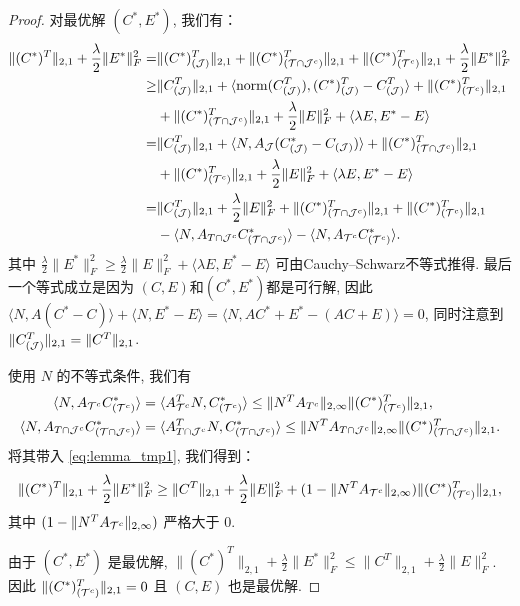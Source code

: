 \begin{proof}
  对最优解 \((C^{*},E^{*})\), 我们有：
  \begin{align}
    \|(C^*)^T\|_{2,1}+\frac{\lambda}{2}\|E^*\|_F^2 =& \|(C^*)^T_{(\mathcal{J})}\|_{2,1}+\|(C^*)^T_{(\mathcal{T}\cap \mathcal{J}^c)}\|_{2,1}+
    \|(C^*)^T_{(\mathcal{T}^c)}\|_{2,1} + \frac{\lambda}{2} \|E^*\|^2_F\nonumber\\
    \geq&\|C^T_{(\mathcal{J})}\|_{2,1}+\langle \operatorname{norm}(C^T_{(\mathcal{J})}),(C^*)^T_{(\mathcal{J})}-C^T_{(\mathcal{J})}
    \rangle+\|(C^*)^T_{(\mathcal{T}^c)}\|_{2,1}\nonumber \\
    &+\|(C^*)^T_{(\mathcal{T}\cap \mathcal{J}^c)}\|_{2,1}+\frac{\lambda}{2} \|E\|^2_F +\langle
    \lambda E,E^*-E\rangle\nonumber\\
    =&\|C^T_{(\mathcal{J})}\|_{2,1}+\langle N,A_{\mathcal{J}}(C^*_{(\mathcal{J})}-C_{(\mathcal{J})})\rangle
     +\|(C^*)^T_{(\mathcal{T}\cap\mathcal{J}^c)}\|_{2,1}\nonumber\\
     &+\|(C^*)^T_{(\mathcal{T}^c)}\|_{2,1} + \frac{\lambda}{2} \|E\|^2_F +\langle
    \lambda E,E^*-E\rangle\nonumber\\
    =&\|C^T_{(\mathcal{J})}\|_{2,1}+\frac{\lambda}{2} \|E\|_F^2+ \|(C^*)^T_{(\mathcal{T}\cap
    \mathcal{J}^c)}\|_{2,1}+\|(C^*)^T_{(\mathcal{T}^c)}\|_{2,1}\nonumber\\
    &-\langle N,A_{T\cap \mathcal{J}^c}C^*_{(\mathcal{T}\cap \mathcal{J}^c)}\rangle
    -\langle N,A_{\mathcal{T}^c}C^*_{(\mathcal{T}^c)}\rangle.
    \label{eq:lemma_tmp1}
  \end{align}
  其中 \(\frac{\lambda}{2} \|E^*\|_F^2 \geq \frac{\lambda}{2} \|E\|_F^2 +\langle
  \lambda E,E^*-E\rangle\) 可由Cauchy–Schwarz不等式推得.
  最后一个等式成立是因为 \((C,E)\)和\((C^*,E^*)\)都是可行解, 因此\(\langle
  N,A(C^*-C)\rangle+\langle N,E^*-E\rangle = \langle
  N,AC^*+E^*-(AC+E)\rangle=0\), 同时注意到 \(\| C^T_{(\mathcal{J})}\|_{2, 1} = \|C^T\|_{2, 1}\).

  使用 \(N\) 的不等式条件, 我们有
  \begin{align*}
    \langle N,A_{\mathcal{T}^c}C^*_{(\mathcal{T}^c)}\rangle&= \langle A_{\mathcal{T}^c}^TN,C^*_{(\mathcal{T}^c)}\rangle
    \leq \|N^T
    A_{T^{c}}\|_{2,\infty}\|(C^*)^T_{(\mathcal{T}^c)}\|_{2,1}, \\
    \langle N,A_{T\cap \mathcal{J}^c}C^*_{(\mathcal{T}\cap \mathcal{J}^c)}\rangle&= 
    \langle A_{T\cap \mathcal{J}^c}^TN,C^*_{(\mathcal{T}\cap \mathcal{J}^c)}\rangle
    \leq \|N^T A_{T\cap \mathcal{J}^{c}}\|_{2,\infty}\|(C^*)^T_{(\mathcal{T}\cap
    \mathcal{J}^c)}\|_{2,1}. 
  \end{align*}
  将其带入 \eqref{eq:lemma_tmp1},    我们得到：
  \begin{equation*}
    \|(C^*)^T\|_{2,1}+\frac{\lambda}{2} \|E^*\|^2_F \geq \|C^T\|_{2,1}+ \frac{\lambda}{2} 
    \|E\|_F^2 +(1-\|N^T A_{\mathcal{T}^c}\|_{2, \infty})\|(C^*)^T_{(\mathcal{T}^c)}\|_{2,1},
  \end{equation*}
  其中 \((1-\|N^T A_{\mathcal{T}^c}\|_{2, \infty})\) 严格大于 \(0\).

  由于 \((C^*,E^*)\) 是最优解, \(\|(C^*)^T\|_{2,1}+\frac{\lambda}{2}
  \|E^*\|_F^2\leq \|C^T\|_{2, 1}+\frac{\lambda}{2} \|E\|_F^2\). 
  因此 \(\|(C^*)^T_{(\mathcal{T}^c)}\|_{2,1}=0\) 且 \((C,E)\) 也是最优解.
\end{proof}

